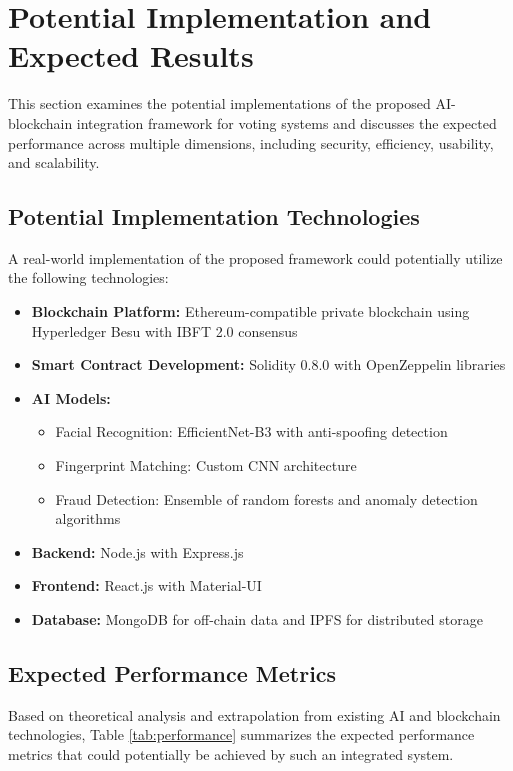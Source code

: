 \documentclass[conference]{IEEEtran}
\begin{document}
\section{Potential Implementation and Expected Results}
This section examines the potential implementations of the proposed AI-blockchain integration framework for voting systems and discusses the expected performance across multiple dimensions, including security, efficiency, usability, and scalability.

\subsection{Potential Implementation Technologies}
A real-world implementation of the proposed framework could potentially utilize the following technologies:

\begin{itemize}
    \item \textbf{Blockchain Platform:} Ethereum-compatible private blockchain using Hyperledger Besu with IBFT 2.0 consensus
    \item \textbf{Smart Contract Development:} Solidity 0.8.0 with OpenZeppelin libraries
    \item \textbf{AI Models:} 
    \begin{itemize}
        \item Facial Recognition: EfficientNet-B3 with anti-spoofing detection
        \item Fingerprint Matching: Custom CNN architecture
        \item Fraud Detection: Ensemble of random forests and anomaly detection algorithms
    \end{itemize}
    \item \textbf{Backend:} Node.js with Express.js
    \item \textbf{Frontend:} React.js with Material-UI
    \item \textbf{Database:} MongoDB for off-chain data and IPFS for distributed storage
\end{itemize}

\subsection{Expected Performance Metrics}
Based on theoretical analysis and extrapolation from existing AI and blockchain technologies, Table \ref{tab:performance} summarizes the expected performance metrics that could potentially be achieved by such an integrated system.
\end{document}
